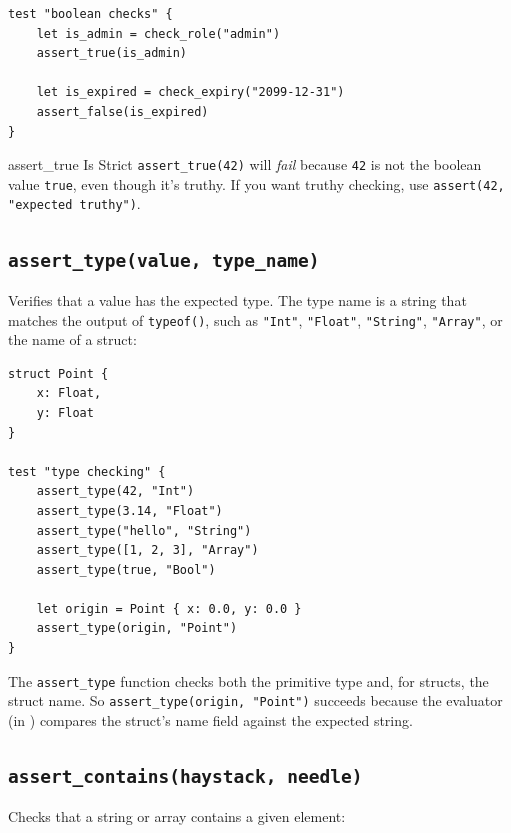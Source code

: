 \begin{lstlisting}[language=Lattice, caption={Strict boolean assertions}]
test "boolean checks" {
    let is_admin = check_role("admin")
    assert_true(is_admin)

    let is_expired = check_expiry("2099-12-31")
    assert_false(is_expired)
}
\end{lstlisting}

\begin{warnbox}{assert\_true Is Strict}
\lstinline|assert_true(42)| will \emph{fail} because \lstinline|42| is not the boolean value \lstinline|true|, even though it's truthy.
If you want truthy checking, use \lstinline|assert(42, "expected truthy")|.
\end{warnbox}

\subsection{\texttt{assert\_type(value, type\_name)}}\label{sec:assert-type}

Verifies that a value has the expected type.
The type name is a string that matches the output of \lstinline|typeof()|, such as \lstinline|"Int"|, \lstinline|"Float"|, \lstinline|"String"|, \lstinline|"Array"|, or the name of a struct:

\begin{lstlisting}[language=Lattice, caption={Type assertions}]
struct Point {
    x: Float,
    y: Float
}

test "type checking" {
    assert_type(42, "Int")
    assert_type(3.14, "Float")
    assert_type("hello", "String")
    assert_type([1, 2, 3], "Array")
    assert_type(true, "Bool")

    let origin = Point { x: 0.0, y: 0.0 }
    assert_type(origin, "Point")
}
\end{lstlisting}

The \lstinline|assert_type| function checks both the primitive type and, for structs, the struct name.
So \lstinline|assert_type(origin, "Point")| succeeds because the evaluator (in ) compares the struct's name field against the expected string.

\subsection{\texttt{assert\_contains(haystack, needle)}}\label{sec:assert-contains}

Checks that a string or array contains a given element:

